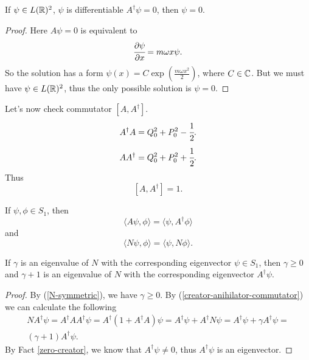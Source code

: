 \documentclass[main.tex]{subfiles}
\begin{document}
\begin{fact}
\label{zero-creator}
    If $\psi\in L(\mathbb{R})^2$, $\psi$ is differentiable $A^\dag \psi = 0$, then $\psi=0$.
\end{fact}
\begin{proof}
Here $A\psi = 0$ is equivalent to
\begin{equation}
    \cfrac{\partial \psi}{\partial x} = m\omega x \psi.
\end{equation}
So the solution has a form $\psi(x) = C\exp(\frac{m\omega x^2}{2})$, where $C\in\mathbb{C}$. But we must have $\psi\in L(\mathbb{R})^2$, thus the only possible solution is $\psi = 0$.
\end{proof}
Let's now check commutator $[A, A^\dag]$.
\begin{equation}
A^\dag A = Q_0^2 + P_0^2 - \cfrac{1}{2}.
\end{equation}
\begin{equation}
A A^\dag = Q_0^2 + P_0^2 + \cfrac{1}{2}.
\end{equation}
Thus
\begin{equation}
\label{creator-anihilator-commutator}
[A, A^\dag] = 1.
\end{equation}
\begin{fact}
If $\psi, \phi\in S_1$, then
\begin{equation}
\langle A\psi, \phi \rangle = \langle \psi, A^\dag \phi \rangle 
\end{equation}
and
\begin{equation}
\label{N-symmetric}
\langle N\psi, \phi \rangle = \langle \psi, N \phi \rangle.
\end{equation}
\end{fact}
\begin{fact}
If $\gamma$ is an eigenvalue of $N$ with the corresponding eigenvector $\psi\in S_1$,
then $\gamma \geq 0$ and $\gamma + 1$ is an eigenvalue of $N$ with the corresponding eigenvector $A^\dag\psi$.
\end{fact}
\begin{proof}
By (\ref{N-symmetric}), we have $\gamma \geq 0$. By (\ref{creator-anihilator-commutator}) we can calculate the following
\begin{multline}
N A^\dag \psi = A^\dag A A^\dag \psi = A^\dag(1 + A^\dag A)\psi = A^\dag\psi + A^\dag N \psi = A^\dag \psi + \gamma A^\dag \psi = \\
(\gamma + 1) A^\dag \psi. 
\end{multline}
By Fact \ref{zero-creator}, we know that $A^\dag \psi\not = 0$, thus $A^\dag \psi$ is an eigenvector. 
\end{proof}
\end{document}
